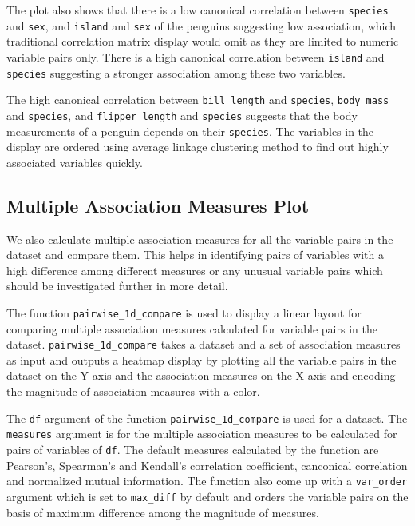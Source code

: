 The plot also shows that there is a low canonical correlation between
\texttt{species} and \texttt{sex}, and \texttt{island} and \texttt{sex}
of the penguins suggesting low association, which traditional
correlation matrix display would omit as they are limited to numeric
variable pairs only. There is a high canonical correlation between
\texttt{island} and \texttt{species} suggesting a stronger association
among these two variables.

The high canonical correlation between \texttt{bill\_length} and
\texttt{species}, \texttt{body\_mass} and \texttt{species}, and
\texttt{flipper\_length} and \texttt{species} suggests that the body
measurements of a penguin depends on their \texttt{species}. The
variables in the display are ordered using average linkage clustering
method to find out highly associated variables quickly.

\hypertarget{multiple-association-measures-plot}{%
\subsection{Multiple Association Measures
Plot}\label{multiple-association-measures-plot}}

We also calculate multiple association measures for all the variable
pairs in the dataset and compare them. This helps in identifying pairs
of variables with a high difference among different measures or any
unusual variable pairs which should be investigated further in more
detail.

The function \texttt{pairwise\_1d\_compare} is used to display a linear
layout for comparing multiple association measures calculated for
variable pairs in the dataset. \texttt{pairwise\_1d\_compare} takes a
dataset and a set of association measures as input and outputs a heatmap
display by plotting all the variable pairs in the dataset on the Y-axis
and the association measures on the X-axis and encoding the magnitude of
association measures with a color.

The \texttt{df} argument of the function \texttt{pairwise\_1d\_compare}
is used for a dataset. The \texttt{measures} argument is for the
multiple association measures to be calculated for pairs of variables of
\texttt{df}. The default measures calculated by the function are
Pearson's, Spearman's and Kendall's correlation coefficient, canconical
correlation and normalized mutual information. The function also come up
with a \texttt{var\_order} argument which is set to \texttt{max\_diff}
by default and orders the variable pairs on the basis of maximum
difference among the magnitude of measures.

